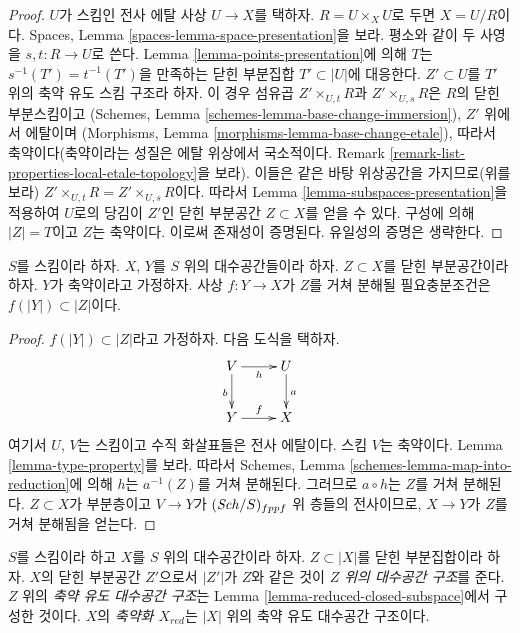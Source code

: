 \begin{proof}
$U$가 스킴인 전사 에탈 사상 $U \to X$를 택하자.
$R = U \times_X U$로 두면 $X = U/R$이다. Spaces, Lemma
\ref{spaces-lemma-space-presentation}을 보라.
평소와 같이 두 사영을 $s, t : R \to U$로 쓴다. Lemma
\ref{lemma-points-presentation}에 의해 $T$는
$s^{-1}(T') = t^{-1}(T')$을 만족하는 닫힌 부분집합
$T' \subset |U|$에 대응한다.
$Z' \subset U$를 $T'$ 위의 축약 유도 스킴 구조라 하자.
이 경우 섬유곱 $Z' \times_{U, t} R$과 $Z' \times_{U, s} R$은
$R$의 닫힌 부분스킴이고
(Schemes, Lemma \ref{schemes-lemma-base-change-immersion}),
$Z'$ 위에서 에탈이며
(Morphisms, Lemma \ref{morphisms-lemma-base-change-etale}),
따라서 축약이다(축약이라는 성질은 에탈 위상에서 국소적이다. Remark
\ref{remark-list-properties-local-etale-topology}을 보라).
이들은 같은 바탕 위상공간을 가지므로(위를 보라)
$Z' \times_{U, t} R = Z' \times_{U, s} R$이다.
따라서 Lemma \ref{lemma-subspaces-presentation}을 적용하여 $U$로의 당김이
$Z'$인 닫힌 부분공간 $Z \subset X$를 얻을 수 있다.
구성에 의해 $|Z| = T$이고 $Z$는 축약이다. 이로써 존재성이 증명된다.
유일성의 증명은 생략한다.
\end{proof}

\begin{lemma}
\label{lemma-map-into-reduction}
$S$를 스킴이라 하자.
$X$, $Y$를 $S$ 위의 대수공간들이라 하자.
$Z \subset X$를 닫힌 부분공간이라 하자.
$Y$가 축약이라고 가정하자.
사상 $f : Y \to X$가 $Z$를 거쳐 분해될 필요충분조건은
$f(|Y|) \subset |Z|$이다.
\end{lemma}

\begin{proof}
$f(|Y|) \subset |Z|$라고 가정하자. 다음 도식을 택하자.
$$
\xymatrix{
V \ar[d]_b \ar[r]_h & U \ar[d]^a \\
Y \ar[r]^f & X
}
$$
여기서 $U$, $V$는 스킴이고 수직 화살표들은 전사 에탈이다.
스킴 $V$는 축약이다. Lemma \ref{lemma-type-property}를 보라.
따라서 Schemes, Lemma \ref{schemes-lemma-map-into-reduction}에 의해
$h$는 $a^{-1}(Z)$를 거쳐 분해된다. 그러므로 $a \circ h$는 $Z$를 거쳐
분해된다. $Z \subset X$가 부분층이고 $V \to Y$가
$(\mathit{Sch}/S)_{fppf}$ 위 층들의 전사이므로,
$X \to Y$가 $Z$를 거쳐 분해됨을 얻는다.
\end{proof}

\begin{definition}
\label{definition-reduced-induced-space}
$S$를 스킴이라 하고 $X$를 $S$ 위의 대수공간이라 하자.
$Z \subset |X|$를 닫힌 부분집합이라 하자.
$X$의 닫힌 부분공간 $Z'$으로서 $|Z'|$가 $Z$와 같은 것이
{\it $Z$ 위의 대수공간 구조}를 준다.
$Z$ 위의 {\it 축약 유도 대수공간 구조}는 Lemma
\ref{lemma-reduced-closed-subspace}에서 구성한 것이다.
$X$의 {\it 축약화 $X_{red}$}는 $|X|$ 위의 축약 유도 대수공간 구조이다.
\end{definition}

